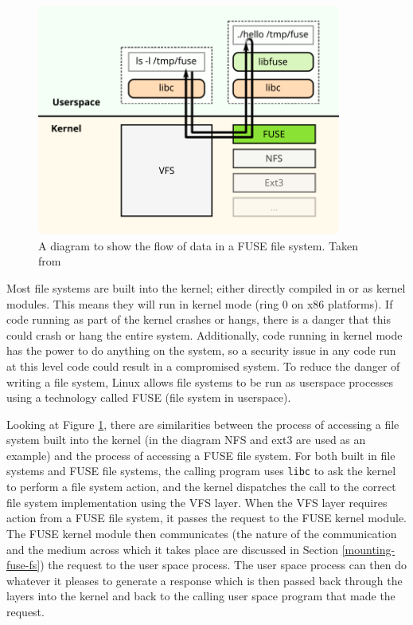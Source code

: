 \begin{figure}[h]
    \centering
    \includegraphics[width=10cm]{../data/fuse.pdf}
    \caption[FUSE Data Flow]{A diagram to show the flow of data in a FUSE file
        system. Taken from \cite{fuse-diagram-source}}
    \label{fig:fuse diagram}
\end{figure}

Most file systems are built into the kernel; either directly compiled in or as
kernel modules. This means they will run in kernel mode (ring 0 on x86
platforms). If code running as part of the kernel crashes or hangs, there is a
danger that this could crash or hang the entire system. Additionally, code
running in kernel mode has the power to do anything on the system, so a
security issue in any code run at this level code could result in a compromised
system. To reduce the danger of writing a file system, Linux allows file
systems to be run as userspace processes using a technology called
FUSE\cite{kernel-fuse} (file system in userspace).

Looking at Figure \ref{fig:fuse diagram}, there are similarities between the
process of accessing a file system built into the kernel (in the diagram NFS
and ext3 are used as an example) and the process of accessing a FUSE file
system. For both built in file systems and FUSE file systems, the calling
program uses \texttt{libc} to ask the kernel to perform a file system action,
and the kernel dispatches the call to the correct file system implementation
using the VFS layer. When the VFS layer requires action from a FUSE file
system, it passes the request to the FUSE kernel module. The FUSE kernel module
then communicates (the nature of the communication and the medium across which
it takes place are discussed in Section \ref{mounting-fuse-fs}) the request to
the user space process. The user space process can then do whatever it pleases
to generate a response which is then passed back through the layers into the
kernel and back to the calling user space program that made the request.


